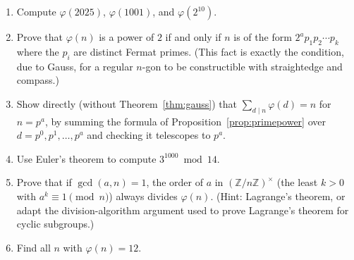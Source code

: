 \documentclass[11pt]{article}
\theoremstyle{definition}
\theoremstyle{remark}
\newcommand{\Z}{\mathbb{Z}}
\begin{document}
\begin{enumerate}[label=(\arabic*)]
\item Compute $\varphi(2025)$, $\varphi(1001)$, and $\varphi(2^{10})$.
\item Prove that $\varphi(n)$ is a power of $2$ if and only if $n$ is of the form $2^a p_1 p_2\cdots p_k$ where the $p_i$ are distinct Fermat primes. (This fact is exactly the condition, due to Gauss, for a regular $n$-gon to be constructible with straightedge and compass.)
\item Show directly (without Theorem~\ref{thm:gauss}) that $\sum_{d \mid n} \varphi(d) = n$ for $n = p^a$, by summing the formula of Proposition~\ref{prop:primepower} over $d = p^0, p^1, \dots, p^a$ and checking it telescopes to $p^a$.
\item Use Euler's theorem to compute $3^{1000} \bmod 14$.
\item Prove that if $\gcd(a,n)=1$, the order of $a$ in $(\Z/n\Z)^\times$ (the least $k>0$ with $a^k\equiv1\pmod n$) always divides $\varphi(n)$. (Hint: Lagrange's theorem, or adapt the division-algorithm argument used to prove Lagrange's theorem for cyclic subgroups.)
\item Find all $n$ with $\varphi(n) = 12$.
\end{enumerate}
\end{document}

